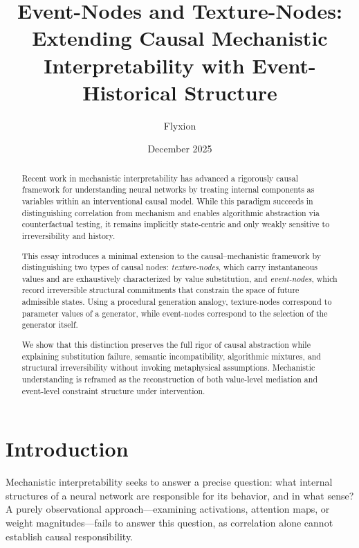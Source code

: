 \documentclass[11pt]{article}
\title{Event-Nodes and Texture-Nodes:\\
Extending Causal Mechanistic Interpretability with Event-Historical Structure}
\author{Flyxion}
\date{December 2025}
\begin{document}
\maketitle

\begin{abstract}

Recent work in mechanistic interpretability has advanced a rigorously causal
framework for understanding neural networks by treating internal components as
variables within an interventional causal model. While this paradigm succeeds
in distinguishing correlation from mechanism and enables algorithmic
abstraction via counterfactual testing, it remains implicitly state-centric and
only weakly sensitive to irreversibility and history.

This essay introduces a minimal extension to the causal--mechanistic framework
by distinguishing two types of causal nodes: \emph{texture-nodes}, which carry
instantaneous values and are exhaustively characterized by value substitution,
and \emph{event-nodes}, which record irreversible structural commitments that
constrain the space of future admissible states. Using a procedural generation
analogy, texture-nodes correspond to parameter values of a generator, while
event-nodes correspond to the selection of the generator itself.

We show that this distinction preserves the full rigor of causal abstraction
while explaining substitution failure, semantic incompatibility, algorithmic
mixtures, and structural irreversibility without invoking metaphysical
assumptions. Mechanistic understanding is reframed as the reconstruction of both
value-level mediation and event-level constraint structure under intervention.

\end{abstract}

\tableofcontents

\section{Introduction}

Mechanistic interpretability seeks to answer a precise question: what internal
structures of a neural network are responsible for its behavior, and in what
sense? A purely observational approach—examining activations, attention maps,
or weight magnitudes—fails to answer this question, as correlation alone cannot
establish causal responsibility.
\end{document}

